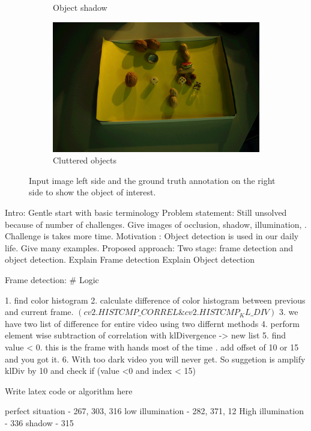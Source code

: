 \documentclass[journal,onecolumn,12pt]{IEEEtran}
\begin{document}
\begin{figure}
\begin{subfigure}[b]{0.3\textwidth}
		\caption{Object shadow} 
	\end{subfigure}
	\hfill
	\begin{subfigure}[b]{0.3\textwidth}  
		\centering 
		\includegraphics[width=\textwidth]{images/challenges/Cluttered_133.png}
		\caption{Cluttered objects} 
	\end{subfigure}
	\caption{Input image left side and the ground truth annotation on the right side to show the object of interest.}
	\label{fig:challenges}
\end{figure}

Intro: Gentle start with basic terminology
Problem statement: Still unsolved because of number of challenges. Give images of occlusion, shadow, illumination, . Challenge is takes more time.
Motivation : Object detection is used in our daily life. Give many examples.
Proposed approach: Two stage: frame detection and object detection.
Explain Frame detection
Explain Object detection


Frame detection: 
\# Logic

1. find color histogram 
2. calculate difference of color histogram between previous and current frame. $(cv2.HISTCMP\_CORREL \& cv2.HISTCMP_KL\_DIV)$
3. we have two list of difference for entire video using two differnt methods
4. perform element wise subtraction of correlation with klDivergence -> new list
5. find value < 0. this is the frame with hands most of the time . add offset of 10 or 15 and you got it.
6. With too dark video you will never get. So suggetion is amplify klDiv by 10 and check if (value <0 and index < 15)

Write latex code or algorithm here

perfect situation - 267, 303, 316
low illumination - 282, 371, 12
High illumination - 336
shadow - 315
\end{document}
